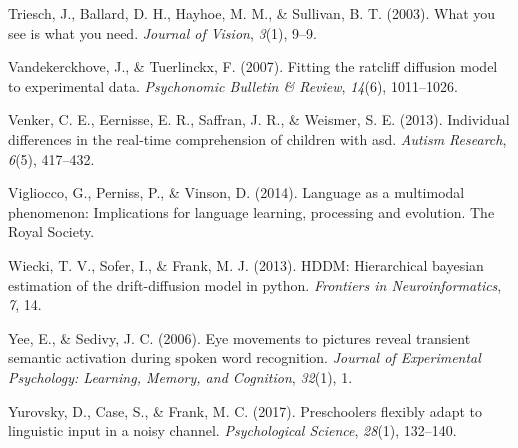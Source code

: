 \documentclass[english,floatsintext,man]{apa6}
\begin{document}
\leavevmode\hypertarget{ref-triesch2003you}{}%
Triesch, J., Ballard, D. H., Hayhoe, M. M., \& Sullivan, B. T. (2003).
What you see is what you need. \emph{Journal of Vision}, \emph{3}(1),
9--9.

\leavevmode\hypertarget{ref-vandekerckhove2007fitting}{}%
Vandekerckhove, J., \& Tuerlinckx, F. (2007). Fitting the ratcliff
diffusion model to experimental data. \emph{Psychonomic Bulletin \&
Review}, \emph{14}(6), 1011--1026.

\leavevmode\hypertarget{ref-venker2013individual}{}%
Venker, C. E., Eernisse, E. R., Saffran, J. R., \& Weismer, S. E.
(2013). Individual differences in the real-time comprehension of
children with asd. \emph{Autism Research}, \emph{6}(5), 417--432.

\leavevmode\hypertarget{ref-vigliocco2014language}{}%
Vigliocco, G., Perniss, P., \& Vinson, D. (2014). Language as a
multimodal phenomenon: Implications for language learning, processing
and evolution. The Royal Society.

\leavevmode\hypertarget{ref-wiecki2013hddm}{}%
Wiecki, T. V., Sofer, I., \& Frank, M. J. (2013). HDDM: Hierarchical
bayesian estimation of the drift-diffusion model in python.
\emph{Frontiers in Neuroinformatics}, \emph{7}, 14.

\leavevmode\hypertarget{ref-yee2006eye}{}%
Yee, E., \& Sedivy, J. C. (2006). Eye movements to pictures reveal
transient semantic activation during spoken word recognition.
\emph{Journal of Experimental Psychology: Learning, Memory, and
Cognition}, \emph{32}(1), 1.

\leavevmode\hypertarget{ref-yurovsky2017preschoolers}{}%
Yurovsky, D., Case, S., \& Frank, M. C. (2017). Preschoolers flexibly
adapt to linguistic input in a noisy channel. \emph{Psychological
Science}, \emph{28}(1), 132--140.
\end{document}

